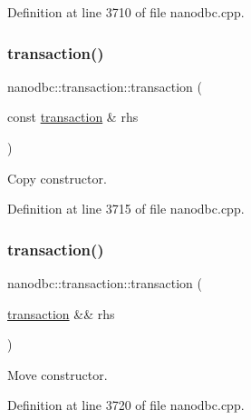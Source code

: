 Definition at line 3710 of file nanodbc.\+cpp.

\mbox{\label{classnanodbc_1_1transaction_ad6550e2168b6914cf5b7409fb07592d7}} 
\subsubsection{\texorpdfstring{transaction()}{transaction()}\hspace{0.1cm}{\footnotesize\ttfamily [2/3]}}
{\footnotesize\ttfamily nanodbc\+::transaction\+::transaction (\begin{DoxyParamCaption}\item[{const \mbox{\hyperlink{classnanodbc_1_1transaction}{transaction}} \&}]{rhs }\end{DoxyParamCaption})}



Copy constructor. 



Definition at line 3715 of file nanodbc.\+cpp.

\mbox{\label{classnanodbc_1_1transaction_a256ea56280c04b0f250749dbdb601eda}} 
\subsubsection{\texorpdfstring{transaction()}{transaction()}\hspace{0.1cm}{\footnotesize\ttfamily [3/3]}}
{\footnotesize\ttfamily nanodbc\+::transaction\+::transaction (\begin{DoxyParamCaption}\item[{\mbox{\hyperlink{classnanodbc_1_1transaction}{transaction}} \&\&}]{rhs }\end{DoxyParamCaption})\hspace{0.3cm}{\ttfamily [noexcept]}}



Move constructor. 



Definition at line 3720 of file nanodbc.\+cpp.

\mbox{\label{classnanodbc_1_1transaction_a0da67846a9ff51f1fa5d1f81d4fde0ea}} 
